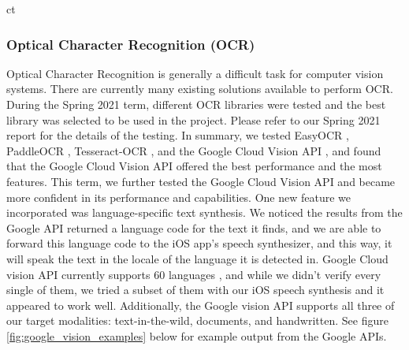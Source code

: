 ct\documentclass[a4paper,11pt]{article}
\begin{document}
\subsubsection{Optical Character Recognition (OCR)}
Optical Character Recognition is generally a difficult task for computer vision systems. There are currently many existing solutions available to perform OCR. During the Spring 2021 term, different OCR libraries were tested and the best library was selected to be used in the project. Please refer to our Spring 2021 report for the details of the testing. In summary, we tested EasyOCR \cite{easy-ocr}, PaddleOCR \cite{paddle-ocr}, Tesseract-OCR \cite{tesseract-github}, and the Google Cloud Vision API \cite{google-vision-api}, and found that the Google Cloud Vision API offered the best performance and the most features. This term, we further tested the Google Cloud Vision API and became more confident in its performance and capabilities. One new feature we incorporated was language-specific text synthesis. We noticed the results from the Google API returned a language code for the text it finds, and we are able to forward this language code to the iOS app's speech synthesizer, and this way, it will speak the text in the locale of the language it is detected in. Google Cloud vision API currently supports 60 languages \cite{google-languages}, and while we didn't verify every single of them, we tried a subset of them with our iOS speech synthesis and it appeared to work well. Additionally, the Google vision API supports all three of our target modalities: text-in-the-wild, documents, and handwritten. See figure \ref{fig:google_vision_examples} below for example output from the Google APIs.
\end{document}
